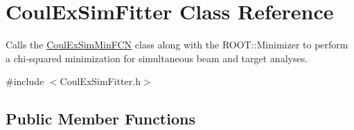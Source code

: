 \hypertarget{classCoulExSimFitter}{\section{Coul\-Ex\-Sim\-Fitter Class Reference}
\label{classCoulExSimFitter}
}


Calls the \hyperlink{classCoulExSimMinFCN}{Coul\-Ex\-Sim\-Min\-F\-C\-N} class along with the R\-O\-O\-T\-::\-Minimizer to perform a chi-\/squared minimization for simultaneous beam and target analyses.  




{\ttfamily \#include $<$Coul\-Ex\-Sim\-Fitter.\-h$>$}

\subsection*{Public Member Functions}

